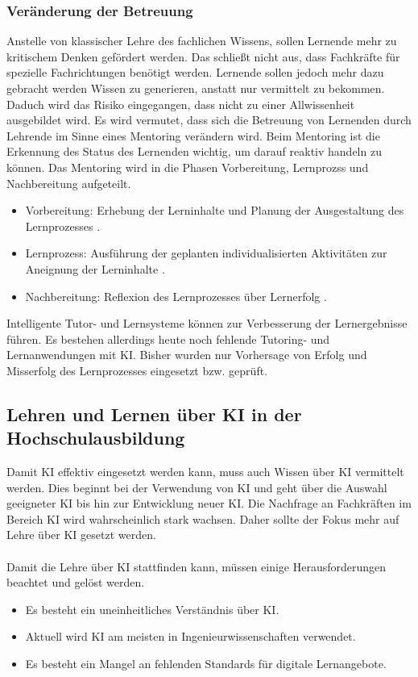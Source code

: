 \subsubsection*{Veränderung der Betreuung}
Anstelle von klassischer Lehre des fachlichen Wissens, sollen Lernende mehr zu kritischem Denken gefördert werden. Das schließt nicht aus, dass Fachkräfte für spezielle Fachrichtungen benötigt werden.
Lernende sollen jedoch mehr dazu gebracht werden Wissen zu generieren, anstatt nur vermittelt zu bekommen.
Daduch wird das Risiko eingegangen, dass nicht zu einer \glqq Allwissenheit\grqq{} ausgebildet wird.
Es wird vermutet, dass sich die Betreuung von Lernenden durch Lehrende im Sinne eines Mentoring verändern wird.
Beim Mentoring ist die Erkennung des Status des Lernenden wichtig, um darauf reaktiv handeln zu können.
Das Mentoring wird in die Phasen Vorbereitung, Lernprozss und Nachbereitung aufgeteilt. \cite*[S. 22f]{Witt.2020}
\begin{itemize}
    \item Vorbereitung: Erhebung der Lerninhalte und Planung der Ausgestaltung des Lernprozesses \cite*[S. 23]{Witt.2020}.
    \item Lernprozess: Ausführung der geplanten individualisierten Aktivitäten zur Aneignung der Lerninhalte \cite*[S. 23]{Witt.2020}.
    \item Nachbereitung: Reflexion des Lernprozesses über Lernerfolg \cite*[S. 23]{Witt.2020}.
\end{itemize}
Intelligente Tutor- und Lernsysteme können zur Verbesserung der Lernergebnisse führen.
Es bestehen allerdings heute noch fehlende Tutoring- und Lernanwendungen mit KI.
Bisher wurden nur Vorhersage von Erfolg und Misserfolg des Lernprozesses eingesetzt bzw. geprüft. \cite*[S. 24]{Witt.2020}

\subsection{Lehren und Lernen über KI in der Hochschulausbildung}
Damit KI effektiv eingesetzt werden kann, muss auch Wissen über KI vermittelt werden.
Dies beginnt bei der Verwendung von KI und geht über die Auswahl geeigneter KI bis hin zur Entwicklung neuer KI.
Die Nachfrage an Fachkräften im Bereich KI wird wahrscheinlich stark wachsen.
Daher sollte der Fokus mehr auf Lehre über KI gesetzt werden. \cite*[S. 26]{Witt.2020}
\\ \noindent
\\ \noindent
Damit die Lehre über KI stattfinden kann, müssen einige Herausforderungen beachtet und gelöst werden.\cite*[S. 27]{Witt.2020}
\begin{itemize}
    \item Es besteht ein uneinheitliches Verständnis über KI. \cite*[S. 27]{Witt.2020}
    \item Aktuell wird \ac{KI} am meisten in Ingenieurwissenschaften verwendet. \cite*[S. 27]{Witt.2020}
    \item Es besteht ein Mangel an fehlenden Standards für digitale Lernangebote. \cite*[S. 27]{Witt.2020}
\end{itemize}

